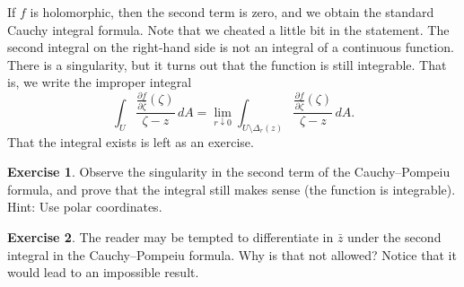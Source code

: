 \documentclass[12pt,openany]{book}
\theoremstyle{plain}
\theoremstyle{remark}
\theoremstyle{definition}
\newenvironment{exbox}{%
    \def\FrameCommand{\vrule width 1pt \relax\hspace{10pt}}%
    \MakeFramed{\advance\hsize-\width\FrameRestore}%
}{%
    \endMakeFramed
}
\theoremstyle{exercise}
\newtheorem{exercise}{Exercise}[section]
\theoremstyle{example}
\begin{document}
If $f$ is holomorphic, then the second term is zero, and we
obtain the standard Cauchy integral formula.
Note that we cheated a little bit in the statement.  The
second integral on the right-hand side is not an integral of a continuous function.
There is a singularity, but it turns out that the function is still integrable.  That
is, we write the improper integral
\begin{equation*}
\int_{U}
\frac{\frac{\partial f}{\partial \bar{\zeta}}(\zeta)}{\zeta-z}
\,
dA 
=
\lim_{r \downarrow 0}
\int_{U \setminus \Delta_r(z)}
\frac{\frac{\partial f}{\partial \bar{\zeta}}(\zeta)}{\zeta-z}
\,
dA .
\end{equation*}
That the integral exists is left as an exercise.

\begin{exbox}
\begin{exercise}
Observe the singularity in the second term of the Cauchy--Pompeiu formula,
and prove that the integral still makes
sense (the function is integrable).  Hint: Use polar coordinates.
\end{exercise}

\begin{exercise}
The reader may be tempted to
differentiate in $\bar{z}$ under the second integral in the 
Cauchy--Pompeiu formula.  Why is that not allowed?
Notice that it would lead to an impossible result.
\end{exercise}
\end{exbox}
\end{document}
